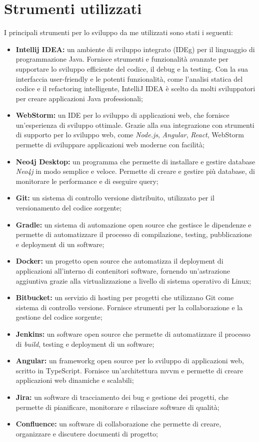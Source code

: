 \section{Strumenti utilizzati}
I principali strumenti per lo sviluppo da me utilizzati sono stati i seguenti:\\
\begin{itemize}
  \item \textbf{Intellij IDEA:} un ambiente di sviluppo integrato (\gls{IDEg}) per il linguaggio di programmazione Java. Fornisce strumenti e funzionalità avanzate per supportare lo sviluppo efficiente del codice, il debug e la testing. Con la sua interfaccia user-friendly e le potenti funzionalità, come l'analisi statica del codice e il refactoring intelligente, IntelliJ IDEA è scelto da molti sviluppatori per creare applicazioni Java professionali;
  \item \textbf{WebStorm:} un IDE per lo sviluppo di applicazioni web, che fornisce un'esperienza di sviluppo ottimale. Grazie alla sua integrazione con strumenti di supporto per lo sviluppo web, come \textit{Node.js}, \textit{Angular}, \textit{React}, WebStorm permette di sviluppare applicazioni web moderne con facilità;
  \item \textbf{Neo4j Desktop:} un programma che permette di installare e gestire database \textit{Neo4j} in modo semplice e veloce. Permette di creare e gestire più database, di monitorare le performance e di eseguire query;
  \item \textbf{Git:} un sistema di controllo versione distribuito, utilizzato per il versionamento del codice sorgente; 
  \item \textbf{Gradle:} un sistema di automazione open source che gestisce le dipendenze e permette di automatizzare il processo di compilazione, testing, pubblicazione e deployment di un software;
  \item \textbf{Docker:} un progetto open source che automatizza il deployment di applicazioni all'interno di contenitori software, fornendo un'astrazione aggiuntiva grazie alla virtualizzazione a livello di sistema operativo di Linux;
  \item \textbf{Bitbucket:} un servizio di hosting per progetti che utilizzano Git come sistema di controllo versione. Fornisce strumenti per la collaborazione e la gestione del codice sorgente;
  \item \textbf{Jenkins:}  un software open source che permette di automatizzare il processo di \textit{build}, testing e deployment di un software;
  \item \textbf{Angular:} un {\gls{frameworkg}} open source per lo sviluppo di applicazioni web, scritto in TypeScript. 
  Fornisce un'architettura \gls{mvvm} e permette di creare applicazioni web dinamiche e scalabili;
  \item \textbf{Jira:} un software di tracciamento dei bug e gestione dei progetti, che permette di pianificare, monitorare e rilasciare software di qualità;
  \item \textbf{Confluence:} un software di collaborazione che permette di creare, organizzare e discutere documenti di progetto;
\end{itemize}

